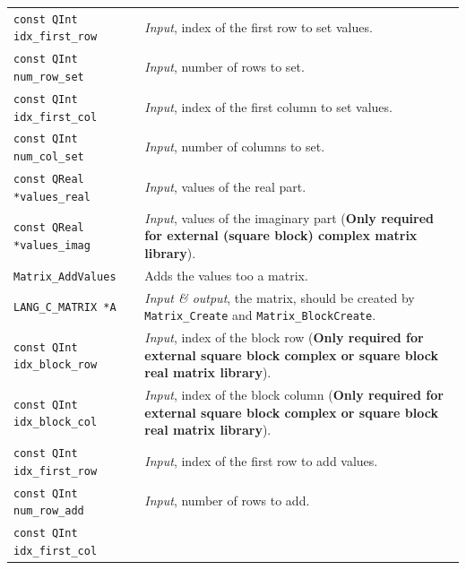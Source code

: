 \documentclass[a4paper,11pt,twoside,openright]{book}
\begin{document}
\begin{center}
\begin{longtable}{l|p{}}
    \hspace*{2ex}\verb|const QInt idx_first_row| %
      & \textsl{Input}, index of the first row to set values.\\
    \hspace*{2ex}\verb|const QInt num_row_set| %
      & \textsl{Input}, number of rows to set.\\
    \hspace*{2ex}\verb|const QInt idx_first_col| %
      & \textsl{Input}, index of the first column to set values.\\
    \hspace*{2ex}\verb|const QInt num_col_set| %
      & \textsl{Input}, number of columns to set.\\
    \hspace*{2ex}\verb|const QReal *values_real| %
      & \textsl{Input}, values of the real part.\\
    \hspace*{2ex}\verb|const QReal *values_imag| %
      & \textsl{Input}, values of the imaginary part %
        (\textbf{Only required for external (square block) complex matrix library}).\\
    \hline
%
    \verb|Matrix_AddValues|\index{\texttt{Matrix\_AddValues}} %
      & Adds the values too a matrix.\\
    \hspace*{2ex}\verb|LANG_C_MATRIX *A| %
      & \textsl{Input \& output}, the matrix, should be created by \verb|Matrix_Create|
        and \verb|Matrix_BlockCreate|.\\
    \hspace*{2ex}\verb|const QInt idx_block_row| %
      & \textsl{Input}, index of the block row %
        (\textbf{Only required for external square block complex or
        square block real matrix library}).\\
    \hspace*{2ex}\verb|const QInt idx_block_col| %
      & \textsl{Input}, index of the block column %
        (\textbf{Only required for external square block complex or
        square block real matrix library}).\\
    \hspace*{2ex}\verb|const QInt idx_first_row| %
      & \textsl{Input}, index of the first row to add values.\\
    \hspace*{2ex}\verb|const QInt num_row_add| %
      & \textsl{Input}, number of rows to add.\\
    \hspace*{2ex}\verb|const QInt idx_first_col| %

\end{longtable}
\end{center}
\end{document}
